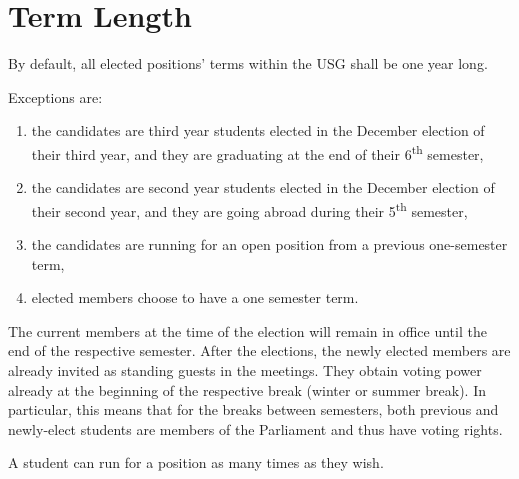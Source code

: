 {\section{Term Length}
By default, all elected positions' terms within the USG shall be one year long.
\begin{parenum}
	\item Exceptions are:
	\begin{enumerate}
		\item 
		the candidates are third year students elected in the December election of their third year, and they are graduating at the end of their 6\textsuperscript{th} semester,
		\item 
		the candidates are second year students elected in the December election of their second year, and they are going abroad during their 5\textsuperscript{th} semester,
		\item
		the candidates are running for an open position from a previous one-semester term,
		\item elected members choose to have a one semester term.
	\end{enumerate}
	\item The current members at the time of the election will remain in office until the end of the respective semester. After the elections, the newly elected members are already invited as standing guests in the meetings. They obtain voting power already at the beginning of the respective break (winter or summer break). In particular, this means that for the breaks between semesters, both previous and newly-elect students are members of the Parliament and thus have voting rights.
	\item A student can run for a position as many times as they wish.
	
\end{parenum}
}